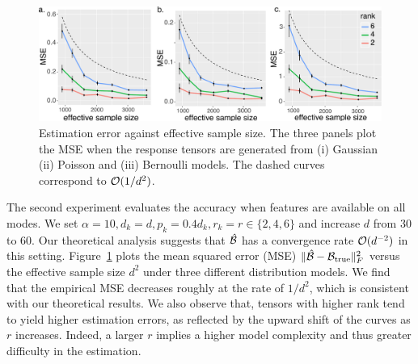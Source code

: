 \documentclass[12pt]{article}
\theoremstyle{definition}
\theoremstyle{definition}
\begin{document}
\begin{table}[tb]
\caption{Rank selection via BIC. The estimated ranks are averaged across 30 simulation. Bold number indicates the ground truth is within two standard deviations of the estimate.}\label{tab:rank}
\end{table}

\begin{figure}[!h]
\centering
\includegraphics[width=14cm]{dimension.pdf}
\caption{Estimation error against effective sample size. The three panels plot the MSE when the response tensors are generated from (i) Gaussian (ii) Poisson and (iii) Bernoulli models. The dashed curves correspond to $\mathcal{O}({1/d^2})$.}\label{fig:dim}
\vspace{-.1cm}
\end{figure}

The second experiment evaluates the accuracy when features are available on all modes. We set $\alpha=10, d_k=d, p_k=0.4d_k, r_k=r\in\{2,4,6\}$ and increase $d$ from 30 to 60. Our theoretical analysis suggests that $\hat {\mathcal{B}}$ has a convergence rate $\mathcal{O}(d^{-2})$ in this setting. Figure~\ref{fig:dim} plots the mean squared error (MSE) $\lVert\hat {\mathcal{B}}-\mathcal{B}_{\text{true}}\rVert_F^2$ versus the effective sample size $d^2$ under three different distribution models. We find that the empirical MSE decreases roughly at the rate of $1/d^2$, which is consistent with our theoretical results. We also observe that, tensors with higher rank tend to yield higher estimation errors, as reflected by the upward shift of the curves as $r$ increases. Indeed, a larger $r$ implies a higher model complexity and thus greater difficulty in the estimation. 
\end{document}
